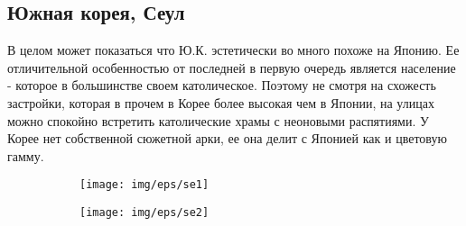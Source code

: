 \documentclass[11pt]{report}
\begin{document}
\clearpage
\subsection{Южная корея, Сеул}
В целом может показаться что Ю.К. эстетически во много похоже на Японию. Ее отличительной особенностью от последней в первую очередь является население - которое в большинстве своем католическое. Поэтому не смотря на схожесть застройки, которая в прочем в Корее более высокая чем в Японии, на улицах можно спокойно встретить католические храмы с неоновыми распятиями.
У Корее нет собственной сюжетной арки, ее она делит с Японией как и цветовую гамму.

\vspace{8ex}
\begin{center}
	\begin{figure}[h]
		\begin{subfigure}{.5\linewidth}
			\texttt{[image: img/eps/se1]}
		\end{subfigure}
		\hfill
		\begin{subfigure}{.5\linewidth}
			\texttt{[image: img/eps/se2]}
		\end{subfigure}
	\end{figure}
\end{center}

\newpage
\end{document}
